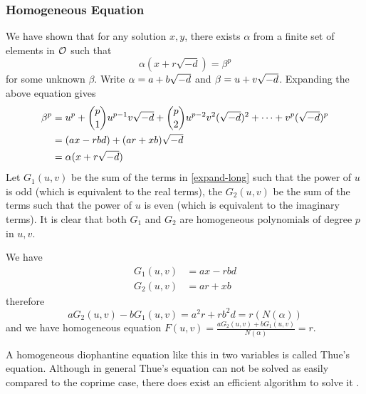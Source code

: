 \subsubsection{Homogeneous Equation}\label{sec:homogeneous}

We have shown that for any solution $x, y$, there exists $\alpha$ from a finite set of elements in $\mathcal{O}$ such that
$$
	\alpha (x + r\sqrt{-d}) = \beta^p
$$
for some unknown $\beta$.
Write $\alpha = a + b \sqrt{-d}$ and $\beta = u + v \sqrt{-d}$. 
Expanding the above equation gives
\begin{align}
	\beta^p &= u^p + \binom{p}{1} u^{p-1} v \sqrt{-d} + \binom{p}{2} u^{p-2} v^2 (\sqrt{-d})^2 + \cdots + v^p (\sqrt{-d})^p \label{expand-long}\\
	 	& = (ax -rbd) + (ar + xb) \sqrt{-d}\\
		& = \alpha (x + r\sqrt{-d})
\end{align}
Let $G_1(u, v)$ be the sum of the terms in \eqref{expand-long} such that the power of $u$ is odd (which is equivalent to the real terms), the $G_2(u, v)$ be the sum of the terms such that the power of $u$ is even (which is equivalent to the imaginary terms).
It is clear that both $G_1$ and $G_2$ are homogeneous polynomials of degree $p$ in $u, v$.

We have 
\begin{align*}
	G_1(u, v) &= ax - rbd\\ 
	G_2(u, v) &= ar + xb
\end{align*}
therefore 
$$
a G_2(u, v) - b G_1(u, v) = a^2 r +rb^2 d = r (N(\alpha))
$$
and we have homogeneous equation $F(u, v) = \frac{a G_2(u, v) + bG_1(u, v)}{N(\alpha)} = r$.

A homogeneous diophantine equation like this in two variables is called Thue's equation. 
Although in general Thue's equation can not be solved as easily compared to the coprime case, there does exist an efficient algorithm to solve it \cite{Gherga_2025}. 

